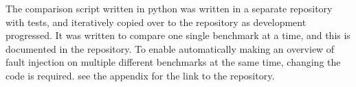 The comparison script written in python was written in a separate repository with tests, and iteratively copied over to the \taffo{} repository as development progressed. It was written to compare one single benchmark at a time, and this is documented in the repository. To enable automatically making an overview of fault injection on multiple different benchmarks at the same time, changing the code is required. see the appendix for the link to the repository.




